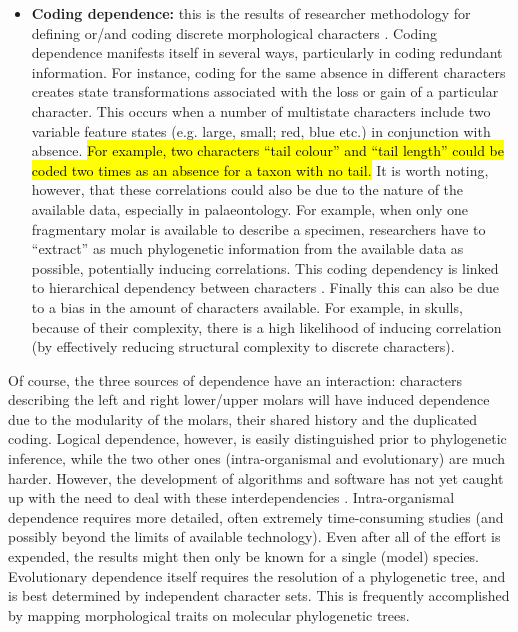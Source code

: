 \documentclass[12pt,letterpaper]{article}
\begin{document}
\begin{itemize}
    \item \textbf{Coding dependence:} this is the results of researcher methodology for defining or/and coding discrete morphological characters \citep{Brazeau2011,simoes2017giant}.
    Coding dependence manifests itself in several ways, particularly in coding redundant information.
    For instance, coding for the same absence in different characters creates state transformations associated with the loss or gain of a particular character.
    This occurs when a number of multistate characters include two variable feature states (e.g. large, small; red, blue etc.) in conjunction with absence.
    \hl{For example, two characters ``tail colour'' and ``tail length'' could be coded two times as an absence for a taxon with no tail.}
    It is worth noting, however, that these correlations could also be due to the nature of the available data, especially in palaeontology.
    For example, when only one fragmentary molar is available to describe a specimen, researchers have to ``extract'' as much phylogenetic information from the available data as possible, potentially inducing correlations.
    This coding dependency is linked to hierarchical dependency between characters \citep{wilkinson1995coping,BrazeauNA}.
    Finally this can also be due to a bias in the amount of characters available.
    For example, in skulls, because of their complexity, there is a high likelihood of inducing correlation (by effectively reducing structural complexity to discrete characters).
\end{itemize}

\noindent Of course, the three sources of dependence have an interaction: characters describing the left and right lower/upper molars will have induced dependence due to the modularity of the molars, their shared history and the duplicated coding.
Logical dependence, however, is easily distinguished prior to phylogenetic inference, while the two other ones (intra-organismal and evolutionary) are much harder.
However, the development of algorithms and software has not yet caught up with the need to deal with these interdependencies \citep{de2015parsimony,BrazeauNA}.
Intra-organismal dependence requires more detailed, often extremely time-consuming studies (and possibly beyond the limits of available technology).
Even after all of the effort is expended, the results might then only be known for a single (model) species.
Evolutionary dependence itself requires the resolution of a phylogenetic tree, and is best determined by independent character sets. 
This is frequently accomplished by mapping morphological traits on molecular phylogenetic trees.
\end{document}
